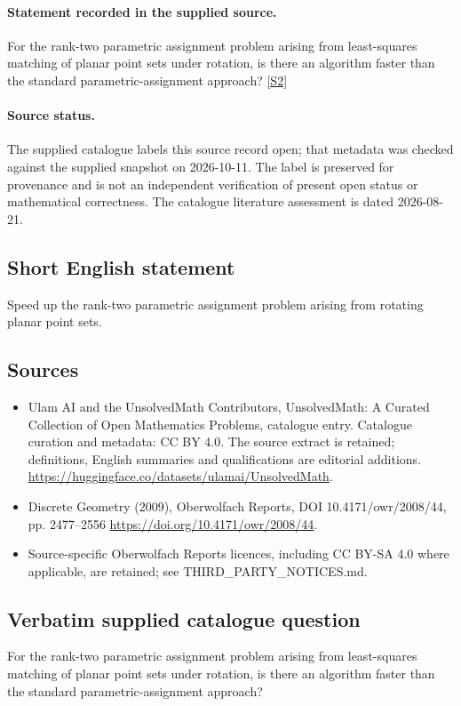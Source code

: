 \documentclass[11pt]{article}
\begin{document}
\paragraph{Statement recorded in the supplied source.}
For the rank-two parametric assignment problem arising from least-squares matching of planar point sets under rotation, is there an algorithm faster than the standard parametric-assignment approach? \href{https://doi.org/10.4171/owr/2008/44}{[S2]}
\paragraph{Source status.}
The supplied catalogue labels this source record open; that metadata was checked against the supplied snapshot on 2026-10-11. The label is preserved for provenance and is not an independent verification of present open status or mathematical correctness. The catalogue literature assessment is dated 2026-08-21.
\subsection{Short English statement}
Speed up the rank-two parametric assignment problem arising from rotating planar point sets.
\subsection{Sources}
\begin{itemize}
\item[S1] Ulam AI and the UnsolvedMath Contributors, UnsolvedMath: A Curated Collection of Open Mathematics Problems, catalogue entry. Catalogue curation and metadata: CC BY 4.0. The source extract is retained; definitions, English summaries and qualifications are editorial additions.
\url{https://huggingface.co/datasets/ulamai/UnsolvedMath}.
\item[S2] Discrete Geometry (2009), Oberwolfach Reports, DOI 10.4171/owr/2008/44, pp. 2477--2556
\url{https://doi.org/10.4171/owr/2008/44}.
\item Source-specific Oberwolfach Reports licences, including CC BY-SA 4.0 where applicable, are retained; see THIRD\_PARTY\_NOTICES.md.
\end{itemize}
\subsection{Verbatim supplied catalogue question}
For the rank-two parametric assignment problem arising from least-squares matching of planar point sets under rotation, is there an algorithm faster than the standard parametric-assignment approach?
\end{document}
